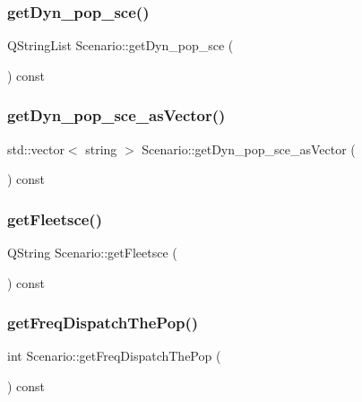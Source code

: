 \mbox{\label{class_scenario_a1e3a6984825427629b1b48ce38a5e4d4}} 
\subsubsection{\texorpdfstring{getDyn\_pop\_sce()}{getDyn\_pop\_sce()}}
{\footnotesize\ttfamily Q\+String\+List Scenario\+::get\+Dyn\+\_\+pop\+\_\+sce (\begin{DoxyParamCaption}{ }\end{DoxyParamCaption}) const}

\mbox{\label{class_scenario_a5f1206fac99cc1314adf771a9622167e}} 
\subsubsection{\texorpdfstring{getDyn\_pop\_sce\_asVector()}{getDyn\_pop\_sce\_asVector()}}
{\footnotesize\ttfamily std\+::vector$<$ string $>$ Scenario\+::get\+Dyn\+\_\+pop\+\_\+sce\+\_\+as\+Vector (\begin{DoxyParamCaption}{ }\end{DoxyParamCaption}) const}

\mbox{\label{class_scenario_a509ef98e8b5bda3095422a66b9ced0eb}} 
\subsubsection{\texorpdfstring{getFleetsce()}{getFleetsce()}}
{\footnotesize\ttfamily Q\+String Scenario\+::get\+Fleetsce (\begin{DoxyParamCaption}{ }\end{DoxyParamCaption}) const}

\mbox{\label{class_scenario_abc85a61b51a0b7a309af46eb016ce634}} 
\subsubsection{\texorpdfstring{getFreqDispatchThePop()}{getFreqDispatchThePop()}}
{\footnotesize\ttfamily int Scenario\+::get\+Freq\+Dispatch\+The\+Pop (\begin{DoxyParamCaption}{ }\end{DoxyParamCaption}) const}

